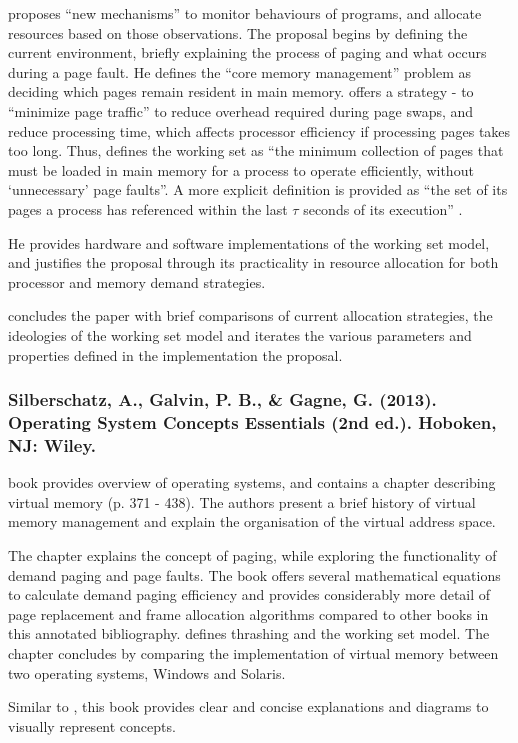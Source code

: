 \citet[p. 15.2]{Denning1967} proposes ``new mechanisms'' to monitor behaviours of programs, and allocate resources based on those observations. The proposal begins by defining the current environment, briefly explaining the process of paging and what occurs during a page fault. He defines the ``core memory management'' problem as deciding which pages remain resident in main memory. \citet[p. 15.3]{Denning1967} offers a strategy - to ``minimize page traffic'' to reduce overhead required during page swaps, and reduce processing time, which affects processor efficiency if processing pages takes too long. Thus, \citet[p. 15.3]{Denning1967} defines the working set as ``the minimum collection of pages that must be loaded in main memory for a process to operate efficiently, without `unnecessary' page faults''. A more explicit definition is provided as ``the set of its pages a process has referenced within the last $\tau$ seconds of its execution'' \citep[p. 15.4]{Denning1967}.  

He provides hardware and software implementations of the working set model, and justifies the proposal through its practicality in resource allocation for both processor and memory demand strategies.

\citet{Denning1967} concludes the paper with brief comparisons of current allocation strategies, the ideologies of the working set model and iterates the various parameters and properties defined in the implementation the proposal.

\subsubsection*{Silberschatz, A., Galvin, P. B., \& Gagne, G. (2013). Operating System Concepts Essentials (2nd ed.). Hoboken, NJ: Wiley.}

 book provides overview of operating systems, and contains a chapter describing virtual memory (p. 371 - 438). The authors present a brief history of virtual memory management and explain the organisation of the virtual address space.

The chapter explains the concept of paging, while exploring the functionality of demand paging and page faults. The book offers several mathematical equations to calculate demand paging efficiency and provides considerably more detail of page replacement and frame allocation algorithms compared to other books in this annotated bibliography. \citet{Silberschatz2013} defines thrashing and the working set model. The chapter concludes by comparing the implementation of virtual memory between two operating systems, Windows and Solaris.

Similar to \citet{Jacob2008}, this book provides clear and concise explanations and diagrams to visually represent concepts.